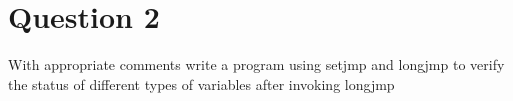 \documentclass[main.tex]{subfiles}
\begin{document}
\section{Question 2}

With appropriate comments write a program using setjmp and longjmp to verify the
status of different types of variables after invoking longjmp



\end{document}
